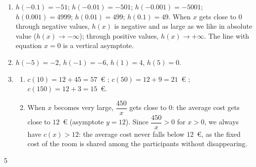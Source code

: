 {\begin{enumerate}
\item $h(-\num{0,1})=-51$; $h(-\num{0,01})=-501$; $h(-\num{0,001})=-\num{5001}$; $h(\num{0,001})=\num{4999}$; $h(\num{0,01})=499$; $h(\num{0,1})=49$. When $x$ gets close to $0$ through negative values, $h(x)$ is negative and as large as we like in absolute value ($h(x)\to-\infty$); through positive values, $h(x)\to+\infty$. The line with equation $x=0$ is a vertical asymptote.
\item $h(-5)=-2$, $h(-1)=-6$, $h(1)=4$, $h(5)=0$.
\begin{center}
\end{center}
\item
\begin{enumerate}[label=\alph*.]
\item $c(10)=12+45=57$~€ ; $c(50)=12+9=21$~€ ; $c(150)=12+3=15$~€.
\item When $x$ becomes very large, $\dfrac{450}{x}$ gets close to $0$: the average cost gets close to $12$~€ (asymptote $y=12$). Since $\dfrac{450}{x}>0$ for $x>0$, we always have $c(x)>12$: the average cost never falls below $12$~€, as the fixed cost of the room is shared among the participants without disappearing.
\end{enumerate}
\end{enumerate}
}{5}

